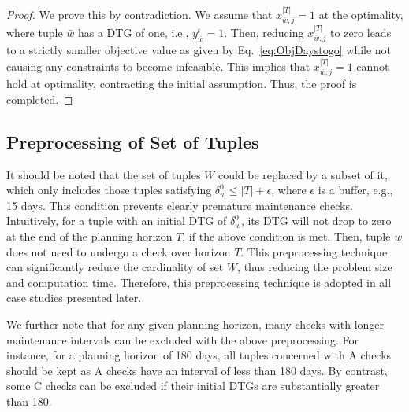 \begin{proof}
We prove this by contradiction. We assume that $x_{\bar{w},j}^{|T|} = 1$ at the optimality, where tuple $\bar{w}$ has a DTG of one, i.e., $y_{\bar{w}}^t = 1$. 
 Then, reducing $x_{\bar{w},j}^{|T|}$ to zero leads to a strictly smaller objective value as given by Eq.~\eqref{eq:ObjDaystogo} while not causing any constraints to become infeasible. This implies that $x_{\bar{w},j}^{|T|} = 1$ cannot hold at optimality, contracting the initial assumption. Thus, the proof is completed. 
\end{proof}

\subsection{Preprocessing of Set of Tuples}

It should be noted that the set of tuples $W$ could be replaced by a subset of it, which only includes those tuples satisfying $\delta_w^0 \leq |T| + \epsilon$, where $\epsilon$ is a buffer, e.g., 15 days. This condition prevents clearly premature maintenance checks. Intuitively, for a tuple with an initial DTG of $\delta_w^0$, its DTG will not drop to zero at the end of the planning horizon $T$, if the above condition is met. Then, tuple $w$ does not need to undergo a check over horizon $T$. This preprocessing technique can significantly reduce the cardinality of set $W$, thus reducing the problem size and computation time. Therefore, this preprocessing technique is adopted in all case studies presented later.

We further note that for any given planning horizon, many checks with longer maintenance intervals can be excluded with the above preprocessing. For instance, for a planning horizon of 180 days, all tuples concerned with A checks should be kept as A checks have an interval of less than 180 days. By contrast, some C checks can be excluded if their initial DTGs are substantially greater than 180. \color{black}
